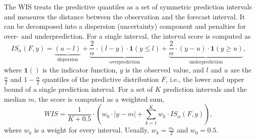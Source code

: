 \documentclass[
]{jss}
\begin{document}
The WIS treats the predictive quantiles as a set of symmetric prediction
intervals and measures the distance between the observation and the
forecast interval. It can be decomposed into a dispersion (uncertainty)
component and penalties for over- and underprediction. For a single
interval, the interval score is computed as
\[IS_\alpha(F,y) = \underbrace{(u-l)}_\text{dispersion} + \underbrace{\frac{2}{\alpha} \cdot (l-y) \cdot \mathbf{1}(y \leq l)}_{\text{overprediction}} + \underbrace{\frac{2}{\alpha} \cdot (y-u) \cdot \mathbf{1}(y \geq u)}_{\text{underprediction}}, \]
where \(\mathbf{1}()\) is the indicator function, \(y\) is the observed
value, and \(l\) and \(u\) are the \(\frac{\alpha}{2}\) and
\(1 - \frac{\alpha}{2}\) quantiles of the predictive distribution \(F\),
i.e., the lower and upper bound of a single prediction interval. For a
set of \(K\) prediction intervals and the median \(m\), the score is
computed as a weighted sum,
\[WIS = \frac{1}{K + 0.5} \cdot \left(w_0 \cdot |y - m| + \sum_{k = 1}^{K} w_k \cdot IS_{\alpha}(F, y)\right),\]
where \(w_k\) is a weight for every interval. Usually,
\(w_k = \frac{\alpha_k}{2}\) and \(w_0 = 0.5\).

\clearpage
\end{document}
